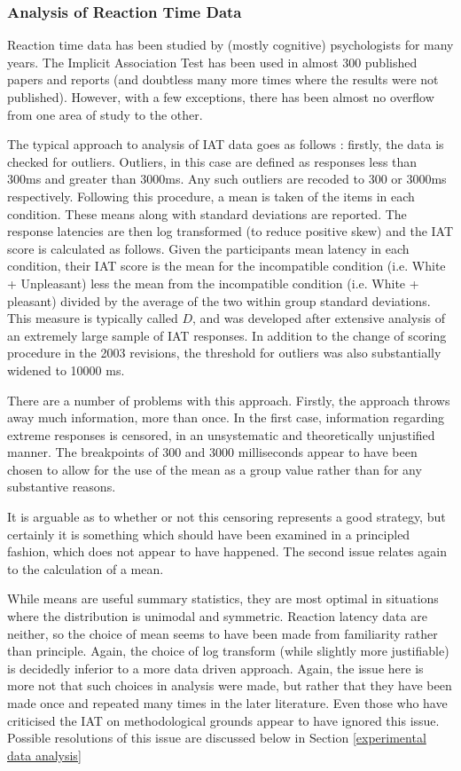 \subsubsection{Analysis of Reaction Time Data}

Reaction time data has been studied by (mostly cognitive) psychologists for many years. The Implicit Association Test has been used in almost 300 published papers and reports (and doubtless many more times where the results were not published). However, with a few exceptions, there has been almost no overflow from one area of study to the other. 

The typical approach to analysis of IAT data goes as follows  \cite{Greenwald1998}: firstly, the data is checked for outliers. Outliers, in this case are defined as responses less than 300ms and greater than 3000ms. Any such outliers are recoded to 300 or 3000ms respectively. Following this procedure, a mean is taken of the items in each condition. These means along with standard deviations are reported. The response latencies are then log transformed (to reduce positive skew) and the IAT score is calculated as follows. Given the participants mean latency in each condition, their IAT score is the mean for the incompatible condition (i.e. White + Unpleasant) less the mean from the incompatible condition (i.e. White + pleasant) divided by the average of the two within group standard deviations. This measure is typically called $D$, and was developed after extensive analysis of an extremely large sample of IAT responses\cite{Greenwald2003a}. 
In addition to the change of scoring procedure in the 2003 revisions, the threshold for outliers was also substantially widened to 10000 ms. 

There are a number of problems with this approach. Firstly, the approach throws away much information, more than once. In the first case, information regarding extreme responses is censored, in an unsystematic and theoretically unjustified manner. The breakpoints of 300 and 3000 milliseconds appear to have been chosen to allow for the use of the mean as a group value rather than for any substantive reasons. 

It is arguable as to whether or not this censoring represents a good strategy, but certainly it is something which should have been examined in a principled fashion, which does not appear to have happened. The second issue relates again to the calculation of a mean. 

While means are useful summary statistics, they are most optimal in situations where the distribution is unimodal and symmetric\cite{venables2002modern}. Reaction latency data are neither, so the choice of mean seems to have been made from familiarity rather than principle. Again, the choice of log transform (while slightly more justifiable) is decidedly inferior to a more data driven approach. Again, the issue here is more not that such choices in analysis were made, but rather that they have been made once and repeated many times in the later literature. Even those who have criticised the IAT \cite{Klauer2005,Mierke2003,Blanton2006} on methodological grounds appear to have ignored this issue. Possible resolutions of this issue are discussed below in Section \ref{experimental data analysis} 

